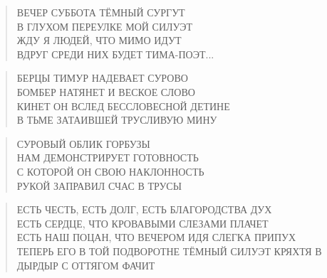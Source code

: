 \poemtitle{***}
\begin{verse}
ВЕЧЕР СУББОТА ТЁМНЫЙ СУРГУТ\\
В ГЛУХОМ ПЕРЕУЛКЕ МОЙ СИЛУЭТ\\
ЖДУ Я ЛЮДЕЙ, ЧТО МИМО ИДУТ\\
ВДРУГ СРЕДИ НИХ БУДЕТ ТИМА-ПОЭТ...
\end{verse}

\poemtitle{***}
\begin{verse}
БЕРЦЫ ТИМУР НАДЕВАЕТ СУРОВО\\
БОМБЕР НАТЯНЕТ И ВЕСКОЕ СЛОВО\\
КИНЕТ ОН ВСЛЕД БЕССЛОВЕСНОЙ ДЕТИНЕ\\
В ТЬМЕ ЗАТАИВШЕЙ ТРУСЛИВУЮ МИНУ
\end{verse}

\poemtitle{***}
\begin{verse}
СУРОВЫЙ ОБЛИК ГОРБУЗЫ\\
НАМ ДЕМОНСТРИРУЕТ ГОТОВНОСТЬ\\
С КОТОРОЙ ОН СВОЮ НАКЛОННОСТЬ\\
РУКОЙ ЗАПРАВИЛ СЧАС В ТРУСЫ
\end{verse}

\poemtitle{***}
\begin{verse}
ЕСТЬ ЧЕСТЬ, ЕСТЬ ДОЛГ, ЕСТЬ БЛАГОРОДСТВА ДУХ\\
ЕСТЬ СЕРДЦЕ, ЧТО КРОВАВЫМИ СЛЕЗАМИ  ПЛАЧЕТ\\
ЕСТЬ НАШ ПОЦАН, ЧТО ВЕЧЕРОМ ИДЯ СЛЕГКА ПРИПУХ\\
ТЕПЕРЬ ЕГО В ТОЙ ПОДВОРОТНЕ ТЁМНЫЙ СИЛУЭТ КРЯХТЯ В ДЫРДЫР С ОТТЯГОМ ФАЧИТ
\end{verse}

